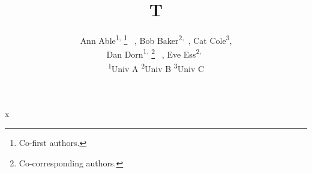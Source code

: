 \documentclass{article}
\newcommand{\blackthanks}[1]{%
    \begingroup
    \renewcommand{\thefootnote}{\textcolor{black}{\fnsymbol{footnote}}}\unskip
    \thanks{#1}
    \unskip\endgroup
}
\begin{document}
\title{T}
\author{
{\rm
Ann Able\textsuperscript{1,}\blackthanks{Co-first authors.}\ ,
Bob Baker\textsuperscript{2,}\footnotemark[1]\ ,
Cat Cole\textsuperscript{3},
}
\\
{\rm
Dan Dorn\textsuperscript{1,}\blackthanks{Co-corresponding authors.}\ ,
Eve Ess\textsuperscript{2,}\footnotemark[2]\ 
}
\\
\textsuperscript{1}Univ A \hspace{1cm}
\textsuperscript{2}Univ B \hspace{1cm}
\textsuperscript{3}Univ C
}
\maketitle
x
\end{document}
